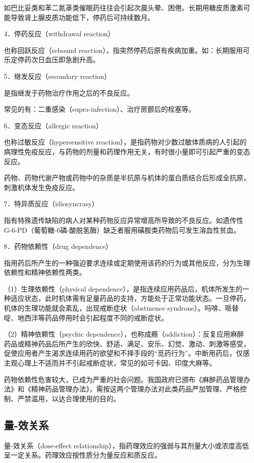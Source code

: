 如巴比妥类和苯二氮䓬类催眠药往往会引起次晨头晕、困倦。长期用糖皮质激素可能导致肾上腺皮质功能低下，停药后可持续数月。

4．停药反应（withdrawal reaction）

也称回跃反应（rebound
reaction），指突然停药后原有疾病加重。如：长期服用可乐定停药次日血压即急剧升高。

5．继发反应（secondary reaction）

是指继发于药物治疗作用之后的不良反应。

常见的有：二重感染（supra-infection）、治疗房颤后的栓塞等。

6．变态反应（allergic reaction）

也称过敏反应（hypersensitive
reaction），是指药物对少数过敏体质病的人引起的病理性免疫反应，与药物的剂量和药理作用无关，有时很小量即可引起严重的变态反应。

药物、药物代谢产物或药物中的杂质是半抗原与机体的蛋白质结合后形成全抗原，刺激机体发生免疫反应。

7．特异质反应（idiosyncrasy）

指有特殊遗传缺陷的病人对某种药物反应异常增高所导致的不良反应。如遗传性G-6-PD（葡萄糖-6磷-酸脱氢酶）缺乏者服用磺胺类药物后可发生溶血性贫血。

8．药物依赖性（drug dependence）

指用药后所产生的一种强迫要求连续或定期使用该药的行为或其他反应，分为生理依赖性和精神依赖性两类。

（1）生理依赖性（physical
dependence），是指连续应用药品后，机体所发生的一种适应状态，此时机体需有足量药品的支持，方能处于正常功能状态。一旦停药，机体的生理功能就会紊乱，出现戒断症状（abstinence
syndrone）。吗啡、哌替啶、地西泮等药品停用时会引起程度不同的戒断症状。

（2）精神依赖性（psychic
dependence），也称成瘾（addiction）：反复应用麻醉药品或精神药品后所产生的欣快、舒适、满足、安乐、幻觉、激动、刺激等感受，促使应用者产生渴求连续用药的欲望和不择手段的“觅药行为”。中断用药后，仅感主观心理上不适而并不引起戒断症状，常见的如可卡因、印度大麻等。

药物依赖性危害较大，已成为严重的社会问题。我国政府已颁布《麻醉药品管理办法》和《精神药品管理办法》，需按这两个管理办法对此类药品严加管理、严格控制、严禁滥用，以达合理使用的目的。

\subsection{量-效关系}

量-效关系（dose-effect
relationship），指药理效应的强弱与其剂量大小或浓度高低呈一定关系。药理效应按性质分为量反应和质反应。

